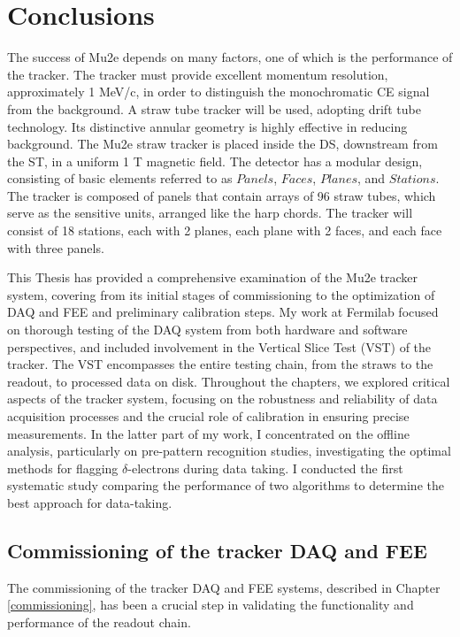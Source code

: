 \chapter{Conclusions}\label{conclusions}
The success of Mu2e depends on many factors, one of which is the performance of the tracker. 
The tracker must provide excellent momentum resolution, approximately 1 MeV/c, 
in order to distinguish the monochromatic CE signal from the background. 
A straw tube tracker will be used, adopting drift tube technology. 
Its distinctive annular geometry is highly effective in reducing background. 
The Mu2e straw tracker is placed inside the DS, downstream from the ST, 
in a uniform 1 T magnetic field. The detector has a modular design, consisting of basic elements referred to as 
$Panels$, $Faces$, $Planes$, and $Stations$. The tracker is composed of panels that contain arrays of 96 straw tubes, 
which serve as the sensitive units, arranged like the harp chords. The tracker will consist of 18 stations, 
each with 2 planes, each plane with 2 faces, and each face with three panels.

This Thesis has provided a comprehensive examination of the Mu2e tracker 
system, covering from its initial stages of commissioning to the optimization 
of DAQ and FEE and preliminary calibration steps. My work at Fermilab 
focused on thorough testing of the DAQ system from both hardware and 
software perspectives, and included involvement in the Vertical Slice Test (VST) of the tracker. 
The VST encompasses the entire testing chain, from the straws to the readout, to processed data on disk.
Throughout the chapters, we explored critical aspects of the tracker 
system, focusing on the robustness and reliability of data acquisition 
processes and the crucial role of calibration in ensuring precise measurements. 
In the latter part of my work, I concentrated on the offline analysis, particularly on pre-pattern recognition 
studies, investigating the optimal methods for flagging $\delta$-electrons during 
data taking. I conducted the first systematic study comparing the performance 
of two algorithms to determine the best approach for data-taking.
\section{Commissioning of the tracker DAQ and FEE}
The commissioning of the tracker DAQ and FEE systems, described in Chapter 
\ref{commissioning}, has been a crucial step in validating the functionality 
and performance of the readout chain.

